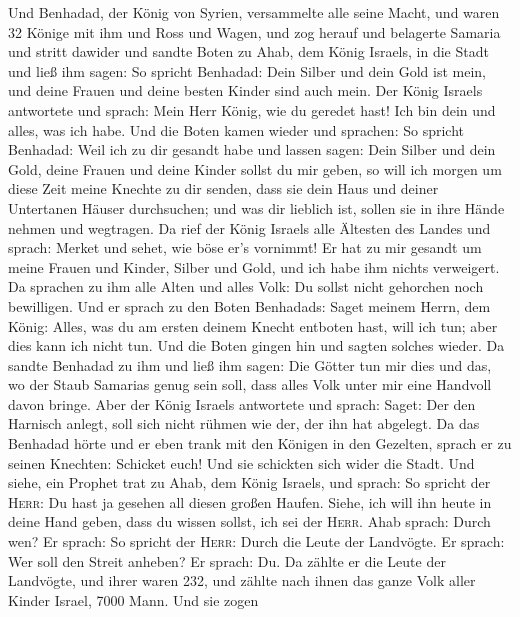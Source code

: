  Und Benhadad, der König von Syrien, versammelte alle
seine Macht, und waren 32 Könige mit ihm und Ross und Wagen, und zog
herauf und belagerte Samaria und stritt dawider  und
sandte Boten zu Ahab, dem König Israels, in die Stadt  und
ließ ihm sagen: So spricht Benhadad: Dein Silber und dein Gold ist mein,
und deine Frauen und deine besten Kinder sind auch mein. 
Der König Israels antwortete und sprach: Mein Herr König, wie du geredet
hast! Ich bin dein und alles, was ich habe.  Und die Boten
kamen wieder und sprachen: So spricht Benhadad: Weil ich zu dir gesandt
habe und lassen sagen: Dein Silber und dein Gold, deine Frauen und deine
Kinder sollst du mir geben,  so will ich morgen um diese
Zeit meine Knechte zu dir senden, dass sie dein Haus und deiner
Untertanen Häuser durchsuchen; und was dir lieblich ist, sollen sie in
ihre Hände nehmen und wegtragen.  Da rief der König
Israels alle Ältesten des Landes und sprach: Merket und sehet, wie böse
er's vornimmt! Er hat zu mir gesandt um meine Frauen und Kinder, Silber
und Gold, und ich habe ihm nichts verweigert.  Da sprachen
zu ihm alle Alten und alles Volk: Du sollst nicht gehorchen noch
bewilligen.  Und er sprach zu den Boten Benhadads: Saget
meinem Herrn, dem König: Alles, was du am ersten deinem Knecht entboten
hast, will ich tun; aber dies kann ich nicht tun. Und die Boten gingen
hin und sagten solches wieder.  Da sandte Benhadad zu ihm
und ließ ihm sagen: Die Götter tun mir dies und das, wo der Staub
Samarias genug sein soll, dass alles Volk unter mir eine Handvoll davon
bringe.  Aber der König Israels antwortete und sprach:
Saget: Der den Harnisch anlegt, soll sich nicht rühmen wie der, der ihn
hat abgelegt.  Da das Benhadad hörte und er eben trank
mit den Königen in den Gezelten, sprach er zu seinen Knechten: Schicket
euch! Und sie schickten sich wider die Stadt.  Und siehe,
ein Prophet trat zu Ahab, dem König Israels, und sprach: So spricht der
\textsc{Herr}: Du hast ja gesehen all diesen großen Haufen. Siehe, ich
will ihn heute in deine Hand geben, dass du wissen sollst, ich sei der
\textsc{Herr}.  Ahab sprach: Durch wen? Er sprach: So
spricht der \textsc{Herr}: Durch die Leute der Landvögte. Er sprach: Wer
soll den Streit anheben? Er sprach: Du.  Da zählte er die
Leute der Landvögte, und ihrer waren 232, und zählte nach ihnen das
ganze Volk aller Kinder Israel, 7000 Mann.  Und sie zogen
